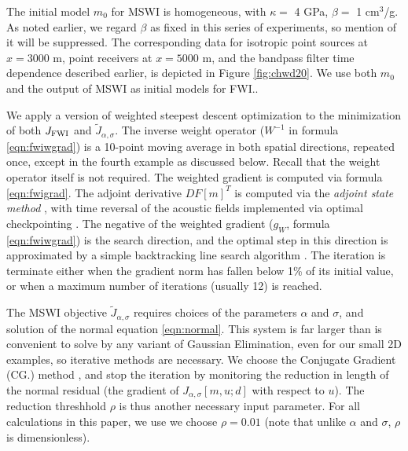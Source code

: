 The initial model $m_0$ for MSWI is homogeneous, with $\kappa = $ 4
GPa, $\beta = $ 1 cm$^3$/g. As noted earlier, we regard $\beta$ as
fixed in this series of experiments, so mention of it will be
suppressed. The corresponding data for isotropic point sources at $x=3000$ m,
point receivers at $x=5000$ m, and the bandpass filter time dependence
described earlier, is depicted in
Figure \ref{fig:chwd20}. We use both $m_0$ and the output of MSWI as
initial models for FWI..


We apply a version of weighted steepest descent optimization to the
minimization of both $J_{\rm FWI}$ and $\tilde{J}_{\alpha,\sigma}$.
The inverse weight operator ($W^{-1}$
in formula \ref{eqn:fwiwgrad}) is a
10-point moving average in both spatial directions, repeated once,
except in the fourth example as discussed below. Recall that the weight operator itself is not required. The weighted
gradient is computed via formula \ref{eqn:fwigrad}. The adjoint
derivative $DF[m]^T$ is computed via the {\em adjoint state method}
\cite[]{Chavent:74,GauTarVir:86}, with time reversal of the acoustic fields
implemented via optimal checkpointing
\cite[]{Griewank:92,Griewank:book,Symes:06a-pub}. The negative of the weighted
gradient ($g_W$, formula \ref{eqn:fwiwgrad}) is the search direction,
and the optimal step in this direction is approximated by a simple
backtracking line search algorithm \cite[]{NocedalWright}. The
iteration is terminate either when the gradient norm has fallen below
1\% of its initial value, or when a maximum number of iterations
(usually 12) is reached.

The MSWI objective $\tilde{J}_{\alpha,\sigma}$ requires choices of the
parameters $\alpha$ and $\sigma$, and solution of the normal equation
\ref{eqn:normal}. This system is far larger than is convenient to solve
by any variant of Gaussian Elimination, even for our small 2D
examples, so iterative methods are 
necessary. We choose the Conjugate Gradient (CG.) method
\cite[]{Dan:67,Steihaug:83,NocedalWright}, and stop the
iteration by monitoring the reduction in length of the normal residual
(the gradient of $J_{\alpha,\sigma}[m,u;d]$ with respect to $u$). The
reduction threshhold $\rho$ is thus another necessary input
parameter. For all calculations in this paper, we use
we choose $\rho = 0.01$ (note that unlike $\alpha$ and $\sigma$,
$\rho$ is dimensionless).

